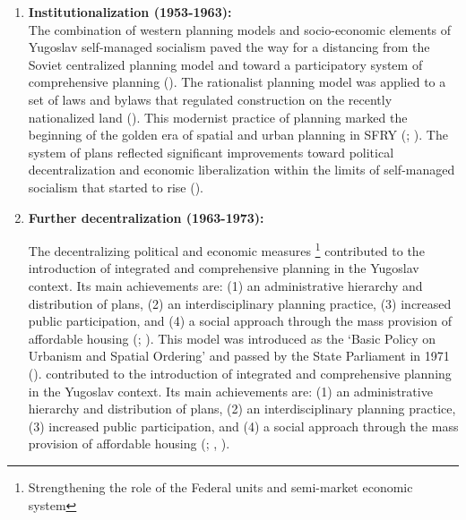 \documentclass[11pt]{report}
\begin{document}
{{{{\begin{enumerate}
This approach was the manifesto of the new social organization (\href{Dobrovic}{\citealt{dobrovic_konture_1946}}; \href{Nedovic}{\citealt{nedovicbudic_waves_2006}}).
However, the 1931 Building Act was applied until the the Master Urban Planning Regulation was passed in 1949 (\href{Nedovic}{\citealt{nedovicbudic_waves_2006}}).
This document showed the first traces of influence from western European planning legislations (\href{Peric}{\citealt{peric_evolution_2016}}).

\item \textbf{Institutionalization (1953-1963):}
\\
The combination of western planning models and socio-economic elements of Yugoslav self-managed socialism paved the way for a distancing from the Soviet centralized planning model and toward a participatory system of comprehensive planning
(\href{Nedovic}{\citealt{nedovic-budic_mornings_2011}}).
The rationalist planning model was applied to a set of laws and bylaws that regulated construction on the recently nationalized land (\href{Vesna}{\citealt{cagic_zakoni_2014}}).
This modernist practice of planning marked the beginning of the golden era of spatial and urban planning in SFRY
(\href{Vujosevic}{\citealt{vujosevic_racionalnost_2004}}; \href{Nedovic}{\citealt{nedovicbudic_waves_2006}}).
The system of plans reflected significant improvements toward political decentralization and economic liberalization within the limits of self-managed socialism that started to rise (\href{Peric}{\citealt{peric_evolution_2016}}).

\item \textbf{Further decentralization (1963-1973):}

The decentralizing political and economic measures
\footnote{Strengthening the role of the Federal units and semi-market economic system}
contributed to the introduction of integrated and comprehensive planning in the Yugoslav context. Its main achievements are: (1) an administrative hierarchy and distribution of plans, (2) an interdisciplinary planning practice, (3) increased public participation, and (4) a social approach through the mass provision of affordable housing (\href{Vesna}{\citealt{cagic_zakoni_2014}}; \href{Peric}{ \citealt{peric_evolution_2016}}). This model was introduced as the ‘Basic Policy on Urbanism and Spatial Ordering’ and passed by the State Parliament in 1971 (\href{Nedovic}{\citealt{nedovicbudic_waves_2006}}).
contributed to the introduction of integrated and comprehensive planning in the Yugoslav context. Its main achievements are: (1) an administrative hierarchy and distribution of plans, (2) an interdisciplinary planning practice, (3) increased public participation, and (4) a social approach through the mass provision of affordable housing (\href{Simmie}{\citealt{simmie_self-management_1989}}; \href{Vujosevic}{\citealt{vujosevic_planiranje_2003}}, \href{Peric}{\citealt{peric_evolution_2016}}).


\end{enumerate}}}}}
\end{document}
